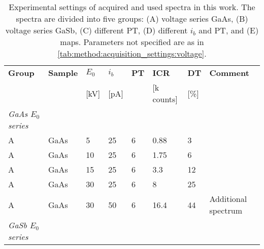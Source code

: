 \begin{table}[phtb]
    \begin{center}
        \caption{
            Experimental settings of acquired and used spectra in this work.
            The spectra are divided into five groups: (A) voltage series GaAs, (B) voltage series GaSb, (C) different PT, (D) different $i_b$ and PT, and (E) maps.
            Parameters not specified are as in \cref{tab:method:acquisition_settings:voltage}.
        }
        \renewcommand*{\arraystretch}{1.2}
        \label{tab:method:acquisition_settings:all_spectra}
        \begin{tabular}{lllllllp{3.5cm}}
            \hline
            \textbf{Group}             & \textbf{Sample} & \textbf{$E_0$} & \textbf{$i_b$} & \textbf{PT} & \textbf{ICR} & \textbf{DT} & \textbf{Comment}    \\
                                       &                 & [kV]           & [pA]           &             & [k counts]   & [\%]        &                     \\
            \hline
            \emph{GaAs $E_0$ series}   &                 &                &                &             &              &             &                     \\
            A                          & GaAs            & 5              & 25             & 6           & 0.88         & 3           &                     \\
            A                          & GaAs            & 10             & 25             & 6           & 1.75         & 6           &                     \\
            A                          & GaAs            & 15             & 25             & 6           & 3.3          & 12          &                     \\
            A                          & GaAs            & 30             & 25             & 6           & 8            & 25          &                     \\
            A                          & GaAs            & 30             & 50             & 6           & 16.4         & 44          & Additional spectrum \\
            \hline
            \emph{GaSb $E_0$ series  } &                 &                &                &             &              &             &                     \\

\end{tabular}
\end{center}
\end{table}
